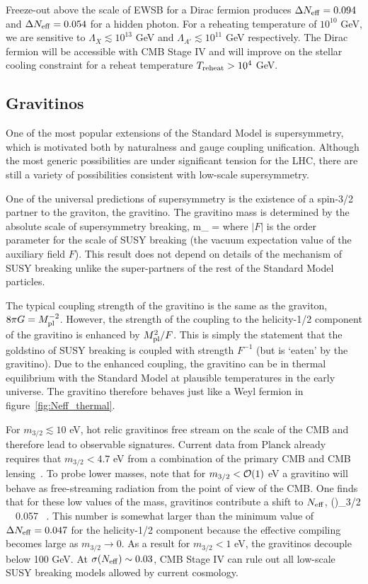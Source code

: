 Freeze-out above the scale of EWSB for a Dirac fermion produces $\Delta N_{\rm eff} = 0.094$ and $\Delta N_{\rm eff} = 0.054$ for a hidden photon.  For a reheating temperature of $10^{10}$ GeV, we are sensitive to $\Lambda_X \lesssim 10^{13}$ GeV and $\Lambda_{A'}  \lesssim 10^{11}$ GeV respectively.  The Dirac fermion will be accessible with CMB Stage IV and will improve on the stellar cooling constraint for a reheat temperature $T_{\rm reheat} > 10^4$ GeV.

\subsection{Gravitinos}

One of the most popular extensions of the Standard Model is supersymmetry, which is motivated both by naturalness and gauge coupling unification.  Although the most generic possibilities are under significant tension for the LHC, there are still a variety of possibilities consistent with low-scale supersymmetry.

One of the universal predictions of supersymmetry is the existence of a spin-3/2 partner to the graviton, the gravitino.  The gravitino mass is determined by the absolute scale of supersymmetry breaking, 
\beq
m_{} = 
\eeq
where $|F|$ is the order parameter for the scale of SUSY breaking (the vacuum expectation value of the auxiliary field $F$).  This result does not depend on details of the mechanism of SUSY breaking unlike the super-partners of the rest of the Standard Model particles.

The typical coupling strength of the gravitino is the same as the graviton, $8 \pi G = M_{\rm pl}^{-2}$.  However, the strength of the coupling to the helicity-1/2 component of the gravitino is enhanced by $M_{\rm pl}^2 /F$.  This is simply the statement that the goldstino of SUSY breaking is coupled with strength $F^{-1}$ (but is `eaten' by the gravitino).  Due to the enhanced coupling, the gravitino can be in thermal equilibrium with the Standard Model at plausible temperatures in the early universe.  The gravitino therefore behaves just like a Weyl fermion in figure~\ref{fig:Neff_thermal}.

For $m_{3/2} \lesssim 10$ eV, hot relic gravitinos free stream on the scale of the CMB and therefore lead to observable signatures.  Current data from Planck already requires that $m_{3/2} < 4.7$ eV from a combination of the primary CMB and CMB lensing~\cite{Osato:2016ixc}.  To probe lower masses, note that for $m_{3/2} < {\cal O}(1)$ eV a gravitino will behave as free-streaming radiation from the point of view of the CMB.  One finds that for these low values of the mass, gravitinos contribute a shift to $N_{\rm eff}$,
\beq
\left(\Delta \Neff\right)_{3/2} \, \gtrsim \, 0.057 \ .
\eeq
This number is somewhat larger than the minimum value of $\Delta N_{\rm eff} =0.047$ for the helicity-1/2 component because the effective compiling becomes large as $m_{3/2} \to 0$.  As a result for $m_{3/2} < 1$ eV, the gravitinos decouple below 100 GeV.  At $\sigma(N_{\rm eff}) \sim 0.03$, CMB Stage IV can rule out all low-scale SUSY breaking models allowed by current cosmology.  

